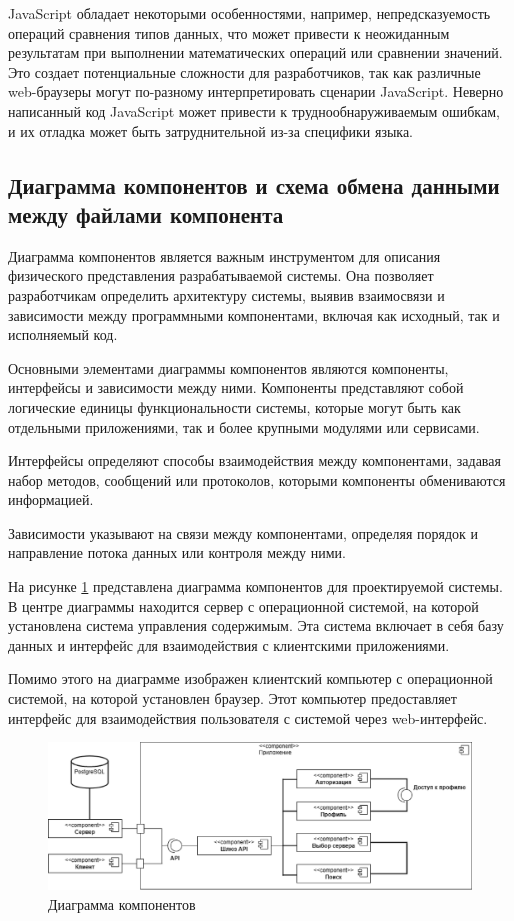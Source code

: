 JavaScript обладает некоторыми особенностями, например, непредсказуемость операций сравнения типов данных, что может привести к неожиданным результатам при выполнении математических операций или сравнении значений. Это создает потенциальные сложности для разработчиков, так как различные web-браузеры могут по-разному интерпретировать сценарии JavaScript. Неверно написанный код JavaScript может привести к труднообнаруживаемым ошибкам, и их отладка может быть затруднительной из-за специфики языка.

\subsection{Диаграмма компонентов и схема обмена данными между файлами компонента}

Диаграмма компонентов является важным инструментом для описания физического представления разрабатываемой системы. Она позволяет разработчикам определить архитектуру системы, выявив взаимосвязи и зависимости между программными компонентами, включая как исходный, так и исполняемый код.

Основными элементами диаграммы компонентов являются компоненты, интерфейсы и зависимости между ними. Компоненты представляют собой логические единицы функциональности системы, которые могут быть как отдельными приложениями, так и более крупными модулями или сервисами.

Интерфейсы определяют способы взаимодействия между компонентами, задавая набор методов, сообщений или протоколов, которыми компоненты обмениваются информацией.

Зависимости указывают на связи между компонентами, определяя порядок и направление потока данных или контроля между ними.

На рисунке \ref{fig:comp} представлена диаграмма компонентов для проектируемой системы. В центре диаграммы находится сервер с операционной системой, на которой установлена система управления содержимым. Эта система включает в себя базу данных и интерфейс для взаимодействия с клиентскими приложениями.

Помимо этого на диаграмме изображен клиентский компьютер с операционной системой, на которой установлен браузер. Этот компьютер предоставляет интерфейс для взаимодействия пользователя с системой через web-интерфейс.

\vspace{-8mm}
\begin{figure}
	\centering
	\includegraphics[width=1\linewidth]{images/comp}
	\caption{Диаграмма компонентов}
	\label{fig:comp}
\end{figure}

